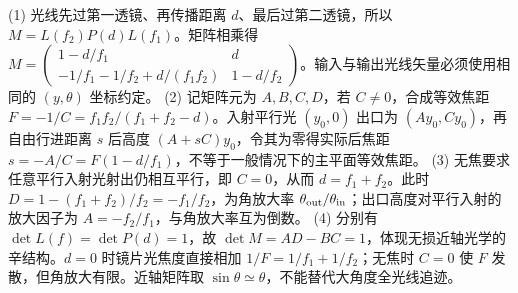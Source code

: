 (1) 光线先过第一透镜、再传播距离 \(d\)、最后过第二透镜，所以 \(M=L(f_2)P(d)L(f_1)\)。矩阵相乘得 \(M=\begin{pmatrix}1-d/f_1&d\\-1/f_1-1/f_2+d/(f_1f_2)&1-d/f_2\end{pmatrix}\)。输入与输出光线矢量必须使用相同的 \((y,\theta)\) 坐标约定。
(2) 记矩阵元为 \(A,B,C,D\)，若 \(C\ne0\)，合成等效焦距 \(F=-1/C=f_1f_2/(f_1+f_2-d)\)。入射平行光 \((y_0,0)\) 出口为 \((Ay_0,Cy_0)\)，再自由行进距离 \(s\) 后高度 \((A+sC)y_0\)，令其为零得实际后焦距 \(s=-A/C=F(1-d/f_1)\)，不等于一般情况下的主平面等效焦距。
(3) 无焦要求任意平行入射光射出仍相互平行，即 \(C=0\)，从而 \(d=f_1+f_2\)。此时 \(D=1-(f_1+f_2)/f_2=-f_1/f_2\)，为角放大率 \(\theta_{\rm out}/\theta_{\rm in}\)；出口高度对平行入射的放大因子为 \(A=-f_2/f_1\)，与角放大率互为倒数。
(4) 分别有 \(\det L(f)=\det P(d)=1\)，故 \(\det M=AD-BC=1\)，体现无损近轴光学的辛结构。\(d=0\) 时镜片光焦度直接相加 \(1/F=1/f_1+1/f_2\)；无焦时 \(C=0\) 使 \(F\) 发散，但角放大有限。近轴矩阵取 \(\sin\theta\simeq\theta\)，不能替代大角度全光线追迹。
